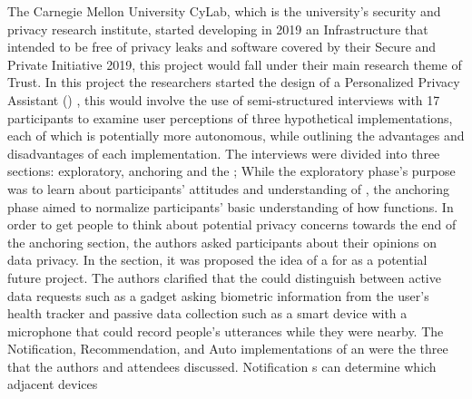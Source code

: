 The Carnegie Mellon University CyLab, which is the university's security
and privacy research institute, started developing in 2019 an \hyperlink{\acronym}{\acronym} Infrastructure
that intended to be free of privacy leaks and software covered by their
Secure and Private \hyperlink{\acronym}{\acronym} Initiative 2019, this project would fall under
their main research theme of Trust. In this project the researchers started the design
of a Personalized Privacy Assistant (\hyperlink{\acronym}{\acronym}) \cite{ColnagoInforming}, this
would involve the use of semi-structured interviews with 17 participants
to examine user perceptions of three hypothetical \hyperlink{\acronym}{\acronym} implementations,
each of which is potentially more autonomous, while outlining the advantages
and disadvantages of each implementation. The interviews were divided into
three sections: exploratory, anchoring and the \hyperlink{\acronym}{\acronym}; While the exploratory
phase's purpose was to learn about participants' attitudes and understanding
of \hyperlink{\acronym}{\acronym}, the anchoring phase aimed to normalize participants' basic understanding
of how \hyperlink{\acronym}{\acronym} functions. In order to get people to think about potential privacy
concerns towards the end of the anchoring section, the authors asked participants
about their opinions on data privacy. In the \hyperlink{\acronym}{\acronym} section, it was proposed
the idea of a \hyperlink{\acronym}{\acronym} for \hyperlink{\acronym}{\acronym} as a potential future project. The authors clarified
that the \hyperlink{\acronym}{\acronym} could distinguish between active data requests such as a gadget
asking biometric information from the user's health tracker and passive
data collection such as a smart device with a microphone that could record
people's utterances while they were nearby. The Notification, Recommendation,
and Auto implementations of an \hyperlink{\acronym}{\acronym} \hyperlink{\acronym}{\acronym} were the three that the authors and
attendees discussed. Notification \hyperlink{\acronym}{\acronym}s can determine which adjacent devices
